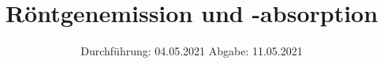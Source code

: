 

\subject{V602}
\title{Röntgenemission und -absorption }
\date{%
  Durchführung: 04.05.2021
  \hspace{3em}
  Abgabe: 11.05.2021
}



\maketitle
\thispagestyle{empty}
\tableofcontents
\newpage






\printbibliography{}


